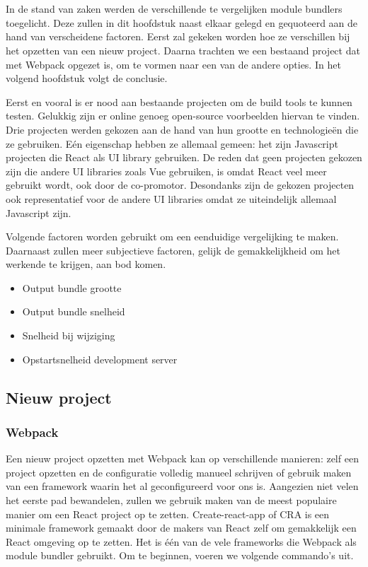 
\chapter{}
\label{ch:methodologie}

In de stand van zaken werden de verschillende te vergelijken module bundlers toegelicht. Deze zullen in dit hoofdstuk naast elkaar gelegd en gequoteerd aan de hand van verscheidene factoren. 
Eerst zal gekeken worden hoe ze verschillen bij het opzetten van een nieuw project. Daarna trachten we een bestaand project dat met Webpack opgezet is, om te vormen naar een van de andere opties. In het volgend hoofdstuk volgt de conclusie.

Eerst en vooral is er nood aan bestaande projecten om de build tools te kunnen testen. Gelukkig zijn er online genoeg open-source voorbeelden hiervan te vinden. Drie projecten werden gekozen aan de hand van hun grootte en technologieën die ze gebruiken. Eén eigenschap hebben ze allemaal gemeen: het zijn Javascript projecten die React als UI library gebruiken. De reden dat geen projecten gekozen zijn die andere UI libraries zoals Vue gebruiken, is omdat React veel meer gebruikt wordt, ook door de co-promotor. Desondanks zijn de gekozen projecten ook representatief voor de andere UI libraries omdat ze uiteindelijk allemaal Javascript zijn. 

Volgende factoren worden gebruikt om een eenduidige vergelijking te maken. Daarnaast zullen meer subjectieve factoren, gelijk de gemakkelijkheid om het werkende te krijgen, aan bod komen.
\begin{itemize}
    \item Output bundle grootte
    \item Output bundle snelheid
    \item Snelheid bij wijziging
    \item Opstartsnelheid development server
\end{itemize}

\section{Nieuw project}
\subsection{Webpack}
Een nieuw project opzetten met Webpack kan op verschillende manieren: zelf een project opzetten en de configuratie volledig manueel schrijven of gebruik maken van een framework waarin het al geconfigureerd voor ons is. Aangezien niet velen het eerste pad bewandelen, zullen we gebruik maken van de meest populaire manier om een React project op te zetten. Create-react-app of CRA is een minimale framework gemaakt door de makers van React zelf om gemakkelijk een React omgeving op te zetten. Het is één van de vele frameworks die Webpack als module bundler gebruikt. Om te beginnen, voeren we volgende commando’s uit. 

